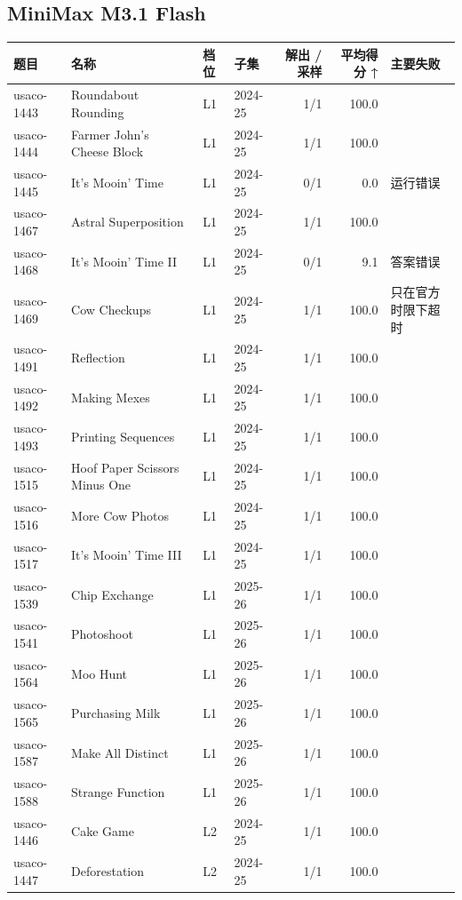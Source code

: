 \documentclass[11pt,a4paper,fontset=none]{ctexart}
\begin{document}
\subsection*{MiniMax M3.1 Flash}
{\footnotesize\setlength{\tabcolsep}{4pt}\begin{longtable}{@{}l>{\raggedright\arraybackslash}p{3.4cm}llrr>{\raggedright\arraybackslash}p{3.1cm}@{}}
\toprule
题目 & 名称 & 档位 & 子集 & 解出 / 采样 & 平均得分 ↑ & 主要失败 \\
\midrule\endhead
usaco-1443 & Roundabout Rounding & L1 & 2024-25 & 1/1 & 100.0 &  \\
usaco-1444 & Farmer John's Cheese Block & L1 & 2024-25 & 1/1 & 100.0 &  \\
usaco-1445 & It's Mooin' Time & L1 & 2024-25 & 0/1 & 0.0 & 运行错误 \\
usaco-1467 & Astral Superposition & L1 & 2024-25 & 1/1 & 100.0 &  \\
usaco-1468 & It's Mooin' Time II & L1 & 2024-25 & 0/1 & 9.1 & 答案错误 \\
usaco-1469 & Cow Checkups & L1 & 2024-25 & 1/1 & 100.0 & 只在官方时限下超时 \\
usaco-1491 & Reflection & L1 & 2024-25 & 1/1 & 100.0 &  \\
usaco-1492 & Making Mexes & L1 & 2024-25 & 1/1 & 100.0 &  \\
usaco-1493 & Printing Sequences & L1 & 2024-25 & 1/1 & 100.0 &  \\
usaco-1515 & Hoof Paper Scissors Minus One & L1 & 2024-25 & 1/1 & 100.0 &  \\
usaco-1516 & More Cow Photos & L1 & 2024-25 & 1/1 & 100.0 &  \\
usaco-1517 & It's Mooin' Time III & L1 & 2024-25 & 1/1 & 100.0 &  \\
usaco-1539 & Chip Exchange & L1 & 2025-26 & 1/1 & 100.0 &  \\
usaco-1541 & Photoshoot & L1 & 2025-26 & 1/1 & 100.0 &  \\
usaco-1564 & Moo Hunt & L1 & 2025-26 & 1/1 & 100.0 &  \\
usaco-1565 & Purchasing Milk & L1 & 2025-26 & 1/1 & 100.0 &  \\
usaco-1587 & Make All Distinct & L1 & 2025-26 & 1/1 & 100.0 &  \\
usaco-1588 & Strange Function & L1 & 2025-26 & 1/1 & 100.0 &  \\
usaco-1446 & Cake Game & L2 & 2024-25 & 1/1 & 100.0 &  \\
usaco-1447 & Deforestation & L2 & 2024-25 & 1/1 & 100.0 &  \\

\end{longtable}}
\end{document}

